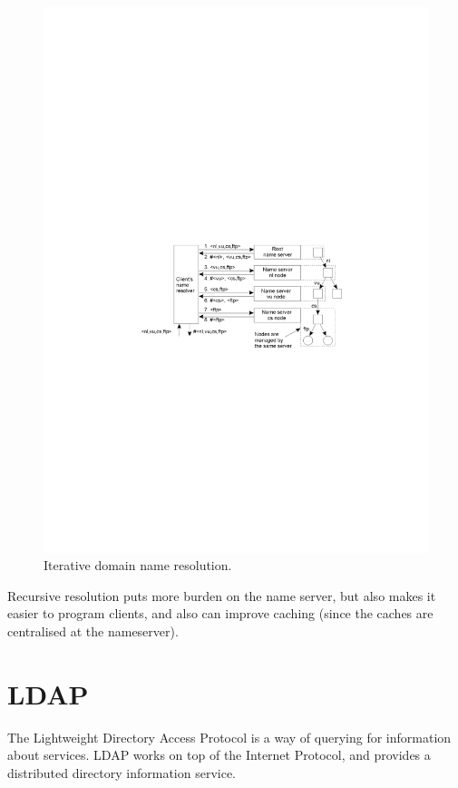 \begin{figure}[H]
  \centering
  \includegraphics[width=\textwidth]{images/iterative-resolution}
  \caption{Iterative domain name resolution.}
  \label{iterative-resolution}
\end{figure}

Recursive resolution puts more burden on the name server, but also makes it
easier to program clients, and also can improve caching (since the caches are
centralised at the nameserver).

\section{LDAP}

The Lightweight Directory Access Protocol is a way of querying for information
about services. LDAP works on top of the Internet Protocol, and provides a
distributed directory information service.

